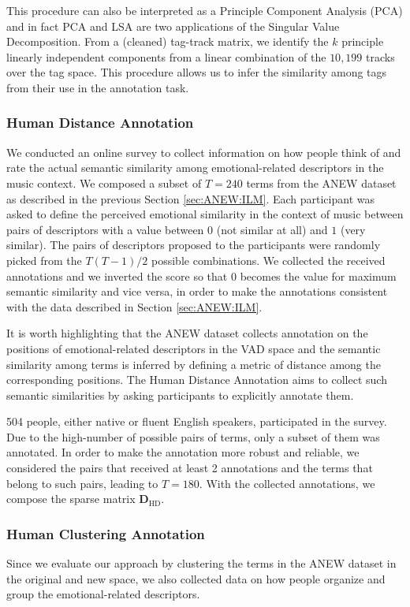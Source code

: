 This procedure can also be interpreted as a Principle Component Analysis (PCA) \cite{Kim2005} and in fact PCA and LSA are two applications of the Singular Value Decomposition. From a (cleaned) tag-track matrix, we identify the $k$ principle linearly independent components from a linear combination of the $10,199$ tracks over the tag space. This procedure allows us to infer the similarity among tags from their use in the annotation task. 

\subsubsection{Human Distance Annotation}
\label{sec:ANEW:HDA}
We conducted an online survey to collect information on how people think of and rate the actual semantic similarity among emotional-related descriptors in the music context. We composed a subset of $T=240$ terms from the ANEW dataset as described in the previous Section \ref{sec:ANEW:ILM}. Each participant was asked to define the perceived emotional similarity in the context of music between pairs of descriptors with a value between $0$ (not similar at all) and $1$ (very similar). The pairs of descriptors proposed to the participants were randomly picked from the $T(T-1)/2$ possible combinations. We collected  
the received annotations and we inverted the score so that $0$ becomes the value for maximum semantic similarity and vice versa, in order to make the annotations consistent with the data described in Section \ref{sec:ANEW:ILM}. 

It is worth highlighting that the ANEW dataset collects annotation on the positions of emotional-related descriptors in the VAD space and the semantic similarity among terms is inferred by defining a metric of distance among the corresponding positions. The Human Distance Annotation aims to collect such semantic similarities by asking participants to explicitly annotate them.

504 people, either native or fluent English speakers, participated in the survey. Due to the high-number of possible pairs of terms, only a subset of them was annotated. In order to make the annotation more robust and reliable, we considered the pairs that received at least 2 annotations and the terms that belong to such pairs, leading to $T=180$. With the collected annotations, we compose the sparse matrix $ \mathbf{D}_{\text{HD}}$.

\subsubsection{Human Clustering Annotation}
\label{sec:ANEW:HCA}
Since we evaluate our approach by clustering the terms in the ANEW dataset in the original and new space, we also collected data on how people organize and group the emotional-related descriptors.

